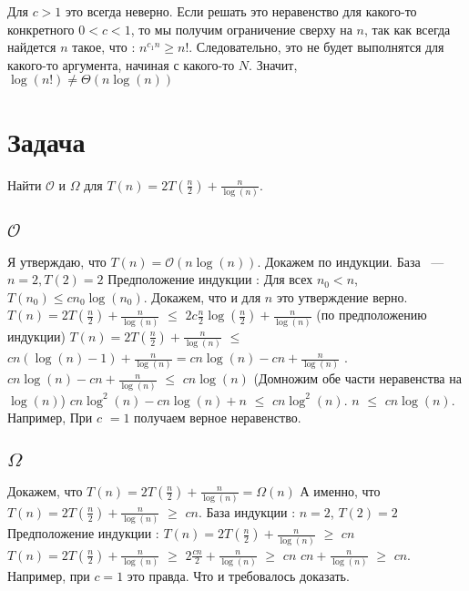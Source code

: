 \documentclass{article}
\begin{document}
Для $c > 1$ это всегда неверно.
\newline
Если решать это неравенство для какого-то конкретного $  0 < c < 1$, то мы получим ограничение сверху на $n$, так как всегда найдется $n$ такое, что : $n^{c_{1}n} \geq n!$. Следовательно, это не будет выполнятся для какого-то аргумента, начиная с какого-то $N$. Значит, $\log(n!) \neq \Theta(n\log(n))$
\newpage

\section{Задача }

Найти $\mathcal{O}$  и  $\Omega$ для $T(n) = 2T(\frac{n}{2}) + \frac{n}{\log(n)}$.
\subsection{$\mathcal{O}$}
Я утверждаю, что $T(n) = \mathcal{O}(n\log(n))$. Докажем по индукции. База ~--- $n = 2, T(2) = 2$
\newline
Предположение индукции : Для всех $n_{0} < n$, $T(n_{0}) \leq cn_{0}\log(n_{0})$. Докажем, что и для $n$ это утверждение верно.
\newline
$T(n) = 2T(\frac{n}{2}) + \frac{n}{\log(n)}$ $\leq$ $2c\frac{n}{2}\log(\frac{n}{2}) + \frac{n}{\log(n)}$  (по предположению индукции)
\newline
$T(n) = 2T(\frac{n}{2}) + \frac{n}{\log(n)}$ $\leq$ $cn(\log(n) - 1) + \frac{n}{\log(n)} = cn\log(n) - cn + \frac{n}{\log(n)}$ .
\newline
$cn\log(n) - cn + \frac{n}{\log(n)}$ $\leq$ $cn\log(n)$ (Домножим обе части неравенства на $\log(n)$)
$cn\log^{2}(n) - cn\log(n) + n$ $\leq$ $cn\log^{2}(n)$.
\newline
$n$ $\leq$ $cn\log(n)$. Например, При $c$ $= 1$ получаем верное неравенство. %

\subsection{$\Omega$}
Докажем, что $T(n) = 2T(\frac{n}{2}) + \frac{n}{\log(n)} = \Omega(n)$
\newline
А именно, что $T(n) = 2T(\frac{n}{2}) + \frac{n}{\log(n)}$ $\geq$ $cn$.
\newline
База индукции : $n = 2$, $T(2) = 2$ 
\newline
Предположение индукции : $T(n) = 2T(\frac{n}{2}) + \frac{n}{\log(n)}$ $\geq$ $cn$
\newline%
$T(n) = 2T(\frac{n}{2}) + \frac{n}{\log(n)}$ $\geq$ $2\frac{cn}{2} + \frac{n}{\log(n)}$ $\geq$ $cn$
\newline
$cn + \frac{n}{\log(n)}$ $\geq$ $cn$. Например, при $c = 1$ это правда.
\newline
Что и требовалось доказать.
\end{document}
